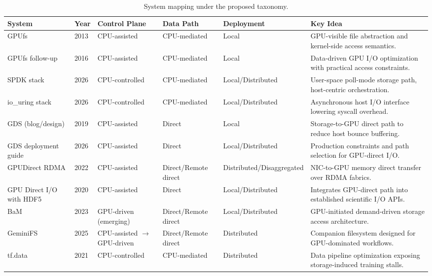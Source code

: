 \begin{table}[t]
\caption{System mapping under the proposed taxonomy.}
\label{tab:taxonomy-mapping}
\centering
\small
\begin{tabular}{@{}p{2.6cm}p{0.9cm}p{2.1cm}p{2.2cm}p{2.0cm}p{5.5cm}@{}}
\toprule
System & Year & Control Plane & Data Path & Deployment & Key Idea \\
\midrule
GPUfs \cite{silberstein2013gpufs} & 2013 & CPU-assisted & CPU-mediated & Local & GPU-visible file abstraction and kernel-side access semantics. \\
GPUfs follow-up \cite{shahar2016gpufs} & 2016 & CPU-assisted & CPU-mediated & Local & Data-driven GPU I/O optimization with practical access constraints. \\
SPDK stack \cite{spdk_overview} & 2026 & CPU-controlled & CPU-mediated & Local/Distributed & User-space poll-mode storage path, host-centric orchestration. \\
io\_uring stack \cite{linux_io_uring} & 2026 & CPU-controlled & CPU-mediated & Local/Distributed & Asynchronous host I/O interface lowering syscall overhead. \\
GDS (blog/design) \cite{nvidia_gds_blog} & 2019 & CPU-assisted & Direct & Local & Storage-to-GPU direct path to reduce host bounce buffering. \\
GDS deployment guide \cite{nvidia_gds_overview} & 2026 & CPU-assisted & Direct & Local/Distributed & Production constraints and path selection for GPU-direct I/O. \\
GPUDirect RDMA \cite{nvidia_gdrdma} & 2022 & CPU-assisted & Direct/Remote direct & Distributed/Disaggregated & NIC-to-GPU memory direct transfer over RDMA fabrics. \\
GPU Direct I/O with HDF5 \cite{hdf5gds2020} & 2020 & CPU-assisted & Direct & Local/Distributed & Integrates GPU-direct path into established scientific I/O APIs. \\
BaM \cite{qureshi2023bam} & 2023 & GPU-driven (emerging) & Direct/Remote direct & Local/Distributed & GPU-initiated demand-driven storage access architecture. \\
GeminiFS \cite{geminifs2025} & 2025 & CPU-assisted $\rightarrow$ GPU-driven & Direct/Remote direct & Distributed & Companion filesystem designed for GPU-dominated workflows. \\
tf.data \cite{murray2021tfdata} & 2021 & CPU-controlled & CPU-mediated & Distributed & Data pipeline optimization exposing storage-induced training stalls. \\

\end{tabular}
\end{table}
